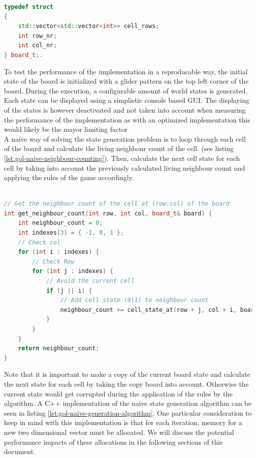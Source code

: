 \documentclass[a4paper,english,12pt,twoside=false]{scrartcl} %
\begin{document}
\begin{lstlisting}[caption={Game of Life Board Datastructure},label={lst:gol-naive-board-datastructure},language=C++]
typedef struct
{
    std::vector<std::vector<int>> cell_rows;
    int row_nr;
    int col_nr;
} board_t;.
\end{lstlisting}

To test the performance of the implementation in a reproducable way, 
the initial state of the board is initialized with a glider pattern on the top left corner of the board. 
During the execution, a configurable amount of world states is generated. 
Each state can be displayed using a simplistic console based GUI. 
The displaying of the states is however deactivated and not taken into account when measuring the performance of the implementation 
as with an optimized implementation this would likely be the mayor limiting factor\\

A naive way of solving the state generation problem is to loop through each cell of the board and calculate the living neighbour count of the cell. (see listing \ref{lst:gol-naive-neighbour-counting}). Then, calculate the next cell state for each cell by taking into account the previously calculated living neighbour count and applying the rules of the game accordingly. 

\begin{lstlisting}[caption={Naive Neighbour Counting},label={lst:gol-naive-neighbour-counting},language=C++]

// Get the neighbour count of the cell at (row:col) of the board
int get_neighbour_count(int row, int col, board_t& board) {
    int neighbour_count = 0;
    int indexes[3] = { -1, 0, 1 };
    // Check col
    for (int i : indexes) {
        // Check Row
        for (int j : indexes) {
            // Avoid the current cell
            if (j || i) {
                // Add cell state (0|1) to neighbour count
                neighbour_count += cell_state_at(row + j, col + i, board);
            }
        }
    }
    return neighbour_count;
}

\end{lstlisting}

Note that it is important to make a copy of the current board state and calculate the next state for each cell by taking the copy board into account. Otherwise the current state would get corrupted during the application of the rules by the algorithm. A C++ implementation of the naive state generation algorithm can be seen in listing \ref{lst:gol-naive-generation-algorithm}. One particular consideration to keep in mind with this implementation is that for each iteration, memory for a new two dimensional vector must be allocated. We will discuss the potential performance impacts of these allocations in the following sections of this document.
\end{document}
